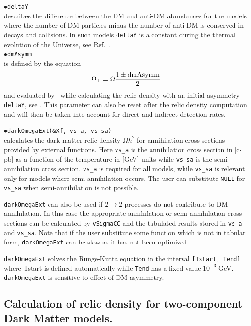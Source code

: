 \documentclass[12pt,a4paper]{article}
\begin{document}
\noindent
$\bullet$\verb|deltaY|\\
describes the difference between the DM and anti-DM abundances for the
models where the number of DM particles minus the number of anti-DM is conserved in
decays and collisions. In such models \verb|deltaY| is a
constant during the thermal evolution of the Universe,   see Ref.~\cite{Belanger:2013oya}.\\
\noindent
$\bullet$\verb|dmAsymm|\\
is defined by the equation 
$$ \Omega_{\pm} = \Omega \frac{1 \pm {\rm dmAsymm}}{2}$$
and evaluated  by \micro\ while calculating the relic density  with an
initial asymmetry \verb|deltaY|, see \cite{Belanger:2013oya}. 
This parameter can also be reset  after the relic density 
computation and will then be taken into account for direct and 
indirect detection rates.

\noindent
$\bullet$\verb|darkOmegaExt(&Xf, vs_a, vs_sa)|\\
calculates the dark matter relic density $\Omega h^2$  
for  annihilation cross sections  provided by  external 
functions. Here  \verb|vs_a| is the  annihilation cross section in [c$\cdot$pb] as 
a function of the temperature in [GeV] units while  \verb|vs_sa| 
is the semi-annihilation cross section.  \verb|vs_a| is required for all models, 
while \verb|vs_sa| is relevant only for models where semi-annihilation occurs.  The user 
can  substitute {\tt NULL} for \verb|vs_sa| when semi-annihilation is not possible.
 
 {\tt darkOmegaExt}   can also be used 
if $ 2 \to 2$ processes do not contribute  to DM  annihilation. In this case the appropriate annihilation or  semi-annihilation
cross sections can be calculated by {\tt vSigmaCC} and the tabulated results stored in \verb|vs_a| and \verb|vs_sa|. Note that if the user substitute some function which is not in tabular form, {\tt darkOmegaExt} can be  slow as it has not been optimized. 

 {\tt darkOmegaExt} solves  the Runge-Kutta equation in the interval {\tt [Tstart, Tend]} 
 where Tstart is defined automatically while {\tt Tend} has a fixed
value $10^{-3}$ GeV.  {\tt darkOmegaExt} is sensitive to effect of DM
asymmetry.
 

\subsection{Calculation of relic density for  two-component Dark Matter models.}
\end{document}
